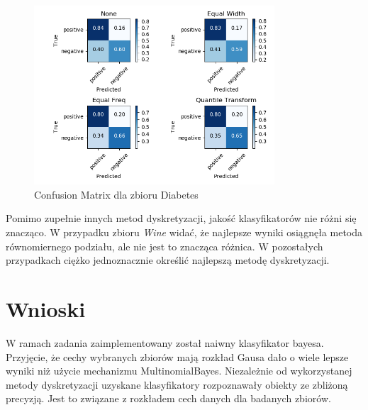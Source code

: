 \documentclass[12pt,a4paper]{article}
\begin{document}
\begin{figure}[H]
\centering
\includegraphics[width=0.8\textwidth]{tmDiabetes.PNG}
\caption{Confusion Matrix dla zbioru Diabetes}
\end{figure}

Pomimo zupełnie innych metod dyskretyzacji, jakość klasyfikatorów nie różni się znacząco. W przypadku zbioru \emph{Wine} widać, że najlepsze wyniki osiągnęła metoda równomiernego podziału, ale nie jest to znacząca różnica. W pozostałych przypadkach ciężko jednoznacznie określić najlepszą metodę dyskretyzacji.
\section{Wnioski}
W ramach zadania zaimplementowany został naiwny klasyfikator bayesa. Przyjęcie, że cechy wybranych zbiorów mają rozkład Gausa dało o wiele lepsze wyniki niż użycie mechanizmu MultinomialBayes. Niezależnie od wykorzystanej metody dyskretyzacji uzyskane klasyfikatory rozpoznawały obiekty ze zbliżoną precyzją. Jest to związane z rozkładem cech danych dla badanych zbiorów.
\end{document}
